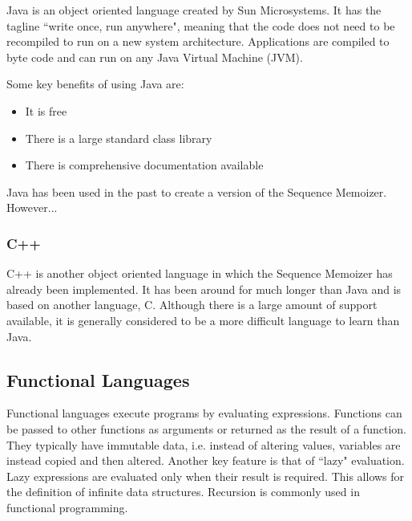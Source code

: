 Java is an object oriented language created by Sun Microsystems. It has the tagline ``write once, run anywhere", meaning that the code does not need to be recompiled to run on a new system architecture. Applications are compiled to byte code and can run on any Java Virtual Machine (JVM).

Some key benefits of using Java are:

\begin{itemize}

\item It is free
\item There is a large standard class library
\item There is comprehensive documentation available 

\end{itemize}

Java has been used in the past to create a version of the Sequence Memoizer. However...



\subsubsection{C++}

C++ is another object oriented language in which the Sequence Memoizer has already been implemented. It has been around for much longer than Java and is based on another language, C. Although there is a large amount of support available, it is generally considered to be a more difficult language to learn than Java.


\subsection{Functional Languages}

Functional languages execute programs by evaluating expressions. Functions can be passed to other functions as arguments or returned as the result of a function. They typically have immutable data, i.e. instead of altering values, variables are instead copied and then altered. Another key feature is that of ``lazy" evaluation. Lazy expressions are evaluated only when their result is required. This allows for the definition of infinite data structures. Recursion is commonly used in functional programming. 

%
%

